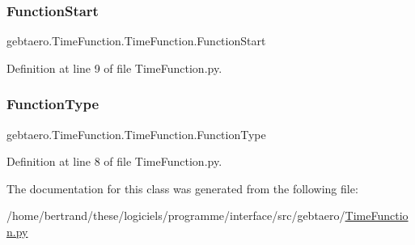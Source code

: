 \subsubsection{\texorpdfstring{Function\+Start}{FunctionStart}}
{\footnotesize\ttfamily gebtaero.\+Time\+Function.\+Time\+Function.\+Function\+Start}



Definition at line 9 of file Time\+Function.\+py.

\mbox{\label{classgebtaero_1_1_time_function_1_1_time_function_a71eb6968c49304736305aee5c1e37d51}} 
\subsubsection{\texorpdfstring{Function\+Type}{FunctionType}}
{\footnotesize\ttfamily gebtaero.\+Time\+Function.\+Time\+Function.\+Function\+Type}



Definition at line 8 of file Time\+Function.\+py.



The documentation for this class was generated from the following file\+:\begin{DoxyCompactItemize}
\item 
/home/bertrand/these/logiciels/programme/interface/src/gebtaero/\hyperlink{_time_function_8py}{Time\+Function.\+py}\end{DoxyCompactItemize}
